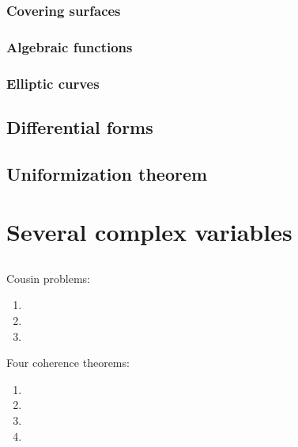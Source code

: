 \documentclass{../../large}
\begin{document}
\section{Covering surfaces}
\section{Algebraic functions}
\section{Elliptic curves}

\chapter{Differential forms}

\chapter{Uniformization theorem}




\part{Several complex variables}

\chapter{}

\section{}
Cousin problems:
\begin{enumerate}
\item 
\item
\item
\end{enumerate}

Four coherence theorems:
\begin{enumerate}
\item 
\item
\item
\item
\end{enumerate}


\section{}
\end{document}
